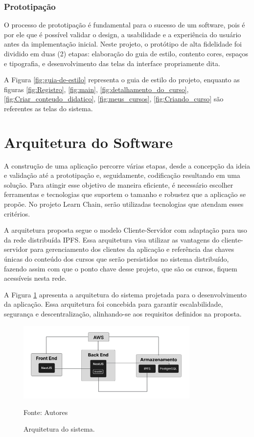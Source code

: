         \subsubsection{Prototipação}

        O processo de prototipação é fundamental para o sucesso de um software, pois é por ele que é possível validar o design, a usabilidade e a experiência do usuário antes da implementação inicial. Neste projeto, o protótipo de alta fidelidade foi dividido em duas (2) etapas: elaboração do guia de estilo, contento cores, espaços e tipografia, e desenvolvimento das telas da interface propriamente dita. 

        A Figura \ref{fig:guia-de-estilo} representa o guia de estilo do projeto, enquanto as figuras \ref{fig:Registro}, \ref{fig:main}, \ref{fig:detalhamento_do_curso}, \ref{fig:Criar_conteudo_didatico}, \ref{fig:meus_cursos}, \ref{fig:Criando_curso} são referentes as telas do sistema.

\section{Arquitetura do Software}
A construção de uma aplicação percorre várias etapas, desde a concepção da ideia e validação até a prototipação e, seguidamente, codificação resultando em uma solução. Para atingir esse objetivo de maneira eficiente, é necessário escolher ferramentas e tecnologias que suportem  o tamanho e robustez que a aplicação se propõe. No projeto Learn Chain, serão utilizadas tecnologias que atendam esses critérios.

A arquitetura proposta segue o modelo Cliente-Servidor com adaptação para uso da rede distribuída IPFS. Essa arquitetura visa utilizar as vantagens do cliente-servidor para gerenciamento dos clientes da aplicação e referência das chaves únicas do conteúdo dos cursos que serão persistidos no sistema distribuído, fazendo assim com que o ponto chave desse projeto, que são os cursos, fiquem acessíveis nesta rede.

A Figura \ref{fig:arquitetura_sistema} apresenta a arquitetura do sistema projetada para o desenvolvimento da aplicação. Essa arquitetura foi concebida para garantir escalabilidade, segurança e descentralização, alinhando-se aos requisitos definidos na proposta.

\begin{figure}[h]
    \centering
    \caption{Arquitetura do sistema.}
    \includegraphics[width=0.8\textwidth]{figuras/arquitetura.png}
    \begin{center}
        {\footnotesize Fonte: Autores}
    \end{center}
    \label{fig:arquitetura_sistema}
\end{figure}

